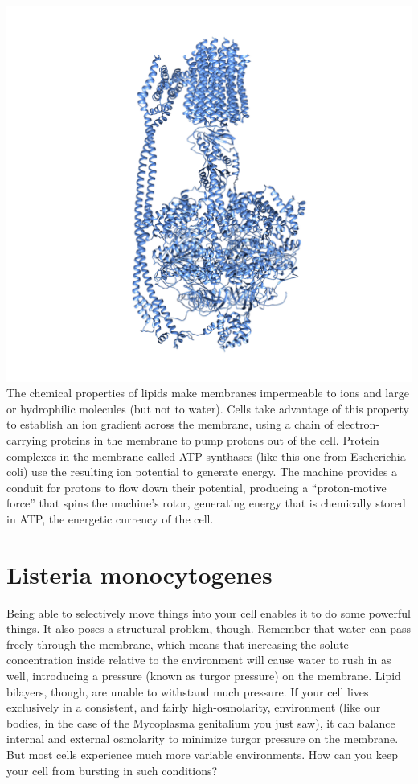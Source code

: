 \documentclass[]{book}
\begin{document}
\includegraphics{img/02_schematic/2_1_2_ATPsynthase.png} The chemical
properties of lipids make membranes impermeable to ions and large or
hydrophilic molecules (but not to water). Cells take advantage of this
property to establish an ion gradient across the membrane, using a chain
of electron-carrying proteins in the membrane to pump protons out of the
cell. Protein complexes in the membrane called ATP synthases (like this
one from Escherichia coli) use the resulting ion potential to generate
energy. The machine provides a conduit for protons to flow down their
potential, producing a ``proton-motive force'' that spins the machine's
rotor, generating energy that is chemically stored in ATP, the energetic
currency of the cell.

\section{Listeria monocytogenes}\label{listeria-monocytogenes}

Being able to selectively move things into your cell enables it to do
some powerful things. It also poses a structural problem, though.
Remember that water can pass freely through the membrane, which means
that increasing the solute concentration inside relative to the
environment will cause water to rush in as well, introducing a pressure
(known as turgor pressure) on the membrane. Lipid bilayers, though, are
unable to withstand much pressure. If your cell lives exclusively in a
consistent, and fairly high-osmolarity, environment (like our bodies, in
the case of the Mycoplasma genitalium you just saw), it can balance
internal and external osmolarity to minimize turgor pressure on the
membrane. But most cells experience much more variable environments. How
can you keep your cell from bursting in such conditions?
\end{document}
